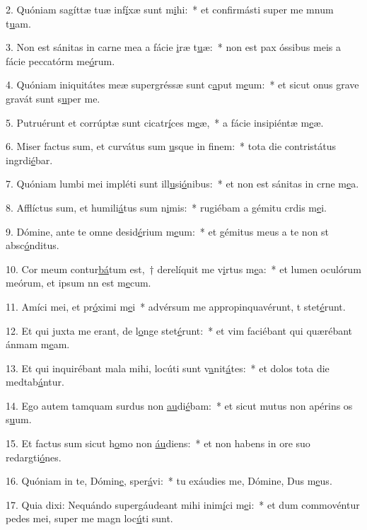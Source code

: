 2. Quóniam sagíttæ tuæ inf\uline{í}xæ sunt m\uline{i}hi:~* et confirmásti super me mnum t\uline{u}am.\par 
3. Non est sánitas in carne mea a fácie \uline{i}ræ t\uline{u}æ:~* non est pax óssibus meis a fácie peccatórm me\uline{ó}rum.\par 
4. Quóniam iniquitátes meæ supergréssæ sunt c\uline{a}put m\uline{e}um:~* et sicut onus grave gravát sunt s\uline{u}per me.\par 
5. Putruérunt et corrúptæ sunt cicatr\uline{í}ces m\uline{e}æ,~* a fácie insipiéntæ m\uline{e}æ.\par 
6. Miser factus sum, et curvátus sum \uline{u}sque in f\uline{i}nem:~* tota die contristátus ingrdi\uline{é}bar.\par 
7. Quóniam lumbi mei impléti sunt ill\uline{u}si\uline{ó}nibus:~* et non est sánitas in crne m\uline{e}a.\par 
8. Afflíctus sum, et humili\uline{á}tus sum n\uline{i}mis:~* rugiébam a gémitu crdis m\uline{e}i.\par 
9. Dómine, ante te omne desid\uline{é}rium m\uline{e}um:~* et gémitus meus a te non st absc\uline{ó}nditus.\par 
10. Cor meum contur\uline{bá}tum est,~† derelíquit me v\uline{i}rtus m\uline{e}a:~* et lumen oculórum meórum, et ipsum nn est m\uline{e}cum.\par 
11. Amíci mei, et pr\uline{ó}ximi m\uline{e}i~* advérsum me appropinquavérunt, t stet\uline{é}runt.\par 
12. Et qui juxta me erant, de l\uline{o}nge stet\uline{é}runt:~* et vim faciébant qui quærébant ánmam m\uline{e}am.\par 
13. Et qui inquirébant mala mihi, locúti sunt v\uline{a}nit\uline{á}tes:~* et dolos tota die medtab\uline{á}ntur.\par 
14. Ego autem tamquam surdus non \uline{au}di\uline{é}bam:~* et sicut mutus non apérins os s\uline{u}um.\par 
15. Et factus sum sicut h\uline{o}mo non \uline{áu}diens:~* et non habens in ore suo redargti\uline{ó}nes.\par 
16. Quóniam in te, Dómin\uline{e}, sper\uline{á}vi:~* tu exáudies me, Dómine, Dus m\uline{e}us.\par 
17. Quia dixi: Nequándo supergáudeant mihi inim\uline{í}ci m\uline{e}i:~* et dum commovéntur pedes mei, super me magn loc\uline{ú}ti sunt.\par 
